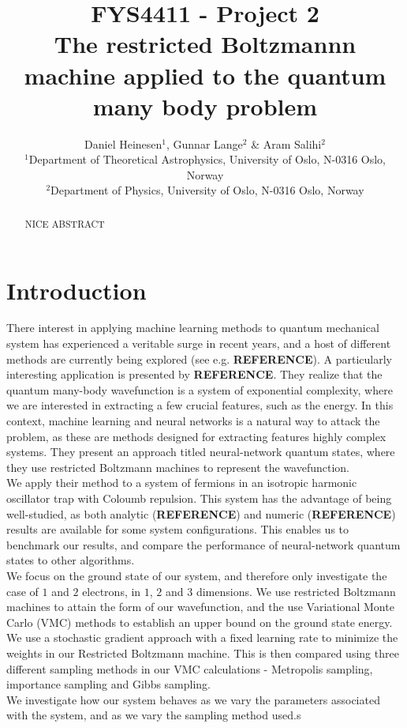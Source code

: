\documentclass[a4paper, 10pt]{article}
\title{FYS4411 - Project 2\\
	The restricted Boltzmannn machine applied to the quantum many body problem}
\author{Daniel Heinesen$^1$, Gunnar Lange$^2$ \& Aram Salihi$^2$\\
	\small $^1$Department of Theoretical Astrophysics, University of Oslo, N-0316 Oslo, Norway\\
	\small $^2$Department of Physics, University of Oslo, N-0316 Oslo, Norway}
\begin{document}
	\maketitle
	\begin{abstract}
	\begin{center}
	 NICE ABSTRACT
\end{center}
	\end{abstract}
	\newpage
	\tableofcontents
	\newpage
	\section{Introduction}
	There interest in applying machine learning methods to quantum mechanical system has experienced a veritable surge in recent years, and a host of different methods are currently being explored (see e.g. \textbf{REFERENCE}). A particularly interesting application is presented by \textbf{REFERENCE}. They realize that the quantum many-body wavefunction is a system of exponential complexity, where we are interested in extracting a few crucial features, such as the energy. In this context, machine learning and neural networks is a natural way to attack the problem, as these are methods designed for extracting features highly complex systems. They present an approach titled neural-network quantum states, where they use restricted Boltzmann machines to represent the wavefunction.\\
	\linebreak
	We apply their method to a system of fermions in an isotropic harmonic oscillator trap with Coloumb repulsion. This system has the advantage of being well-studied, as both analytic (\textbf{REFERENCE}) and numeric (\textbf{REFERENCE}) results are available for some system configurations. This enables us to benchmark our results, and compare the performance of neural-network quantum states to other algorithms.\\
	\linebreak
	We focus on the ground state of our system, and therefore only investigate the case of $1$ and $2$ electrons, in $1$, $2$ and $3$ dimensions. We use restricted Boltzmann machines to attain the form of our wavefunction, and the use Variational Monte Carlo (VMC) methods to establish an upper bound on the ground state energy. We use a stochastic gradient approach with a fixed learning rate to minimize the weights in our Restricted Boltzmann machine. This is then compared using three different sampling methods in our VMC calculations - Metropolis sampling, importance sampling and Gibbs sampling.\\
	\linebreak
	We investigate how our system behaves as we vary the parameters associated with the system, and as we vary the sampling method used.s
\end{document}
